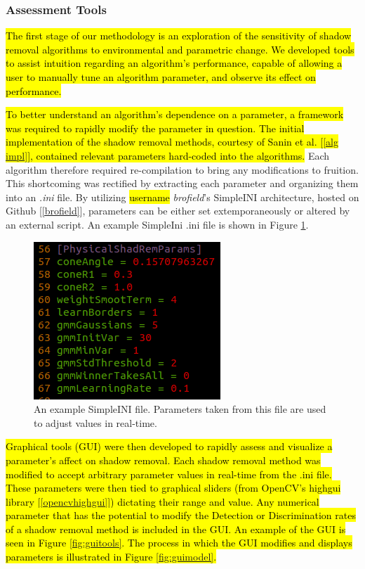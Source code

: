 \documentclass[12pt]{report}
\begin{document}
\subsubsection{Assessment Tools}

\hl{The first stage of our methodology is an exploration of the sensitivity of shadow removal algorithms to environmental and parametric change. We developed tools to assist intuition regarding an algorithm's performance, capable of allowing a user to manually tune an algorithm parameter, and observe its effect on performance.}

\hl{To better understand an algorithm's dependence on a parameter, a framework was required to rapidly modify the parameter in question. The initial implementation of the shadow removal methods, courtesy of Sanin et al. [\ref{alg impl}], contained relevant parameters hard-coded into the algorithms.} Each algorithm therefore required re-compilation to bring any modifications to fruition. This shortcoming was rectified by extracting each parameter and organizing them into an \textit{.ini} file. By utilizing \hl{username} \textit{brofield}'s SimpleINI architecture, hosted on Github [\ref{brofield}], parameters can be either set extemporaneously or altered by an external script. An example SimpleIni .ini file is shown in Figure \ref{fig:simpleini}.

\begin{figure}
  \centering
  \includegraphics[width=.5\linewidth]{figures/simpleini.png}
  \caption{An example SimpleINI file. Parameters taken from this file are used to adjust values in real-time.}
  \label{fig:simpleini}
\end{figure}

\hl{Graphical tools (GUI) were then developed to rapidly assess and visualize a parameter's affect on shadow removal. Each shadow removal method was modified to accept arbitrary parameter values in real-time from the .ini file. These parameters were then tied to graphical sliders (from OpenCV's highgui library [\ref{opencvhighgui}]) dictating their range and value. Any numerical parameter that has the potential to modify the Detection or Discrimination rates of a shadow removal method is included in the GUI. An example of the GUI is seen in Figure \ref{fig:guitools}. The process in which the GUI modifies and displays parameters is illustrated in Figure \ref{fig:guimodel}.}
\end{document}
